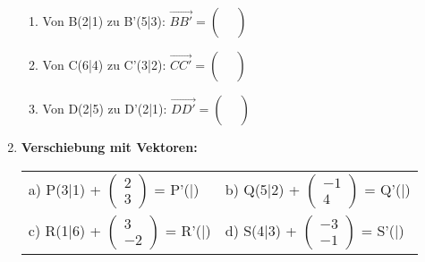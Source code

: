 \begin{enumerate}[label=\arabic*.]
\begin{enumerate}[label=\alph*)]
        \item Von B(2|1) zu B'(5|3): $\overrightarrow{BB'} = \begin{pmatrix} \phantom{0} \\ \phantom{0} \end{pmatrix}$
        \vspace{0.5cm}

        \item Von C(6|4) zu C'(3|2): $\overrightarrow{CC'} = \begin{pmatrix} \phantom{0} \\ \phantom{0} \end{pmatrix}$
        \vspace{0.5cm}

        \item Von D(2|5) zu D'(2|1): $\overrightarrow{DD'} = \begin{pmatrix} \phantom{0} \\ \phantom{0} \end{pmatrix}$
    \end{enumerate}

    \vspace{1cm}

    \item \textbf{Verschiebung mit Vektoren:}
    \vspace{0.5cm}

    \begin{tabular}{ll}
        a) P(3|1) + $\begin{pmatrix} 2 \\ 3 \end{pmatrix}$ = P'(\underline{\hspace{1cm}}|\underline{\hspace{1cm}}) & b) Q(5|2) + $\begin{pmatrix} -1 \\ 4 \end{pmatrix}$ = Q'(\underline{\hspace{1cm}}|\underline{\hspace{1cm}}) \\[4ex]
        c) R(1|6) + $\begin{pmatrix} 3 \\ -2 \end{pmatrix}$ = R'(\underline{\hspace{1cm}}|\underline{\hspace{1cm}}) & d) S(4|3) + $\begin{pmatrix} -3 \\ -1 \end{pmatrix}$ = S'(\underline{\hspace{1cm}}|\underline{\hspace{1cm}})
    \end{tabular}

\end{enumerate}
